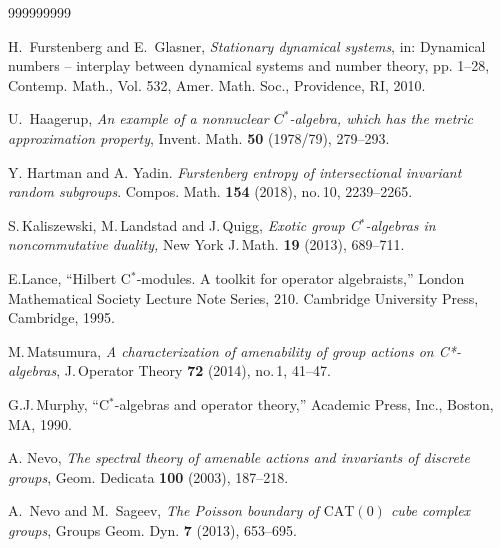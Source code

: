 \documentclass[12pt]{amsart}
\theoremstyle{definition}
\theoremstyle{remark}
\numberwithin{equation}{section}
\begin{document}
\begin{thebibliography}{999999999}

 H.~Furstenberg and E.~Glasner, \emph{Stationary dynamical systems}, in: Dynamical
numbers -- interplay between dynamical systems and number theory, pp. 1--28, Contemp. Math., Vol. 532, Amer. Math. Soc., Providence, RI, 2010.

 U.~Haagerup, \emph{An example of a nonnuclear $C^*$-algebra, which has the metric approximation property}, Invent. Math. \textbf{50} (1978/79), 279--293.

 Y. Hartman and A. Yadin. {\it Furstenberg entropy of intersectional invariant random
subgroups}. Compos. Math. \textbf{154} (2018), no.\,10, 2239--2265.

 S.\,Kaliszewski, M.\,Landstad and J.\,Quigg, {\it Exotic group C$^*$-algebras in noncommutative duality,} New York J.\,Math. \textbf{19} (2013), 689--711.

 E.Lance, ``Hilbert C$^*$-modules. A toolkit for operator algebraists,'' London Mathematical Society Lecture Note Series, 210. Cambridge University Press, Cambridge, 1995.

 M.\,Matsumura, {\it A characterization of amenability of group actions on C*-algebras}, J.\,Operator Theory  \textbf{72} (2014), no.\,1, 41--47.

 G.J.\,Murphy, ``C$^*$-algebras and operator theory,'' Academic Press, Inc., Boston, MA, 1990. 



 A. Nevo, \emph{The spectral theory of amenable actions and invariants of discrete groups}, Geom. Dedicata \textbf{100} (2003), 187--218.

 A.~Nevo and M.~Sageev, \emph{The Poisson boundary of $\mathrm{CAT}(0)$ cube complex groups}, Groups Geom. Dyn. \textbf{7} (2013), 653--695.


\end{thebibliography}
\end{document}

